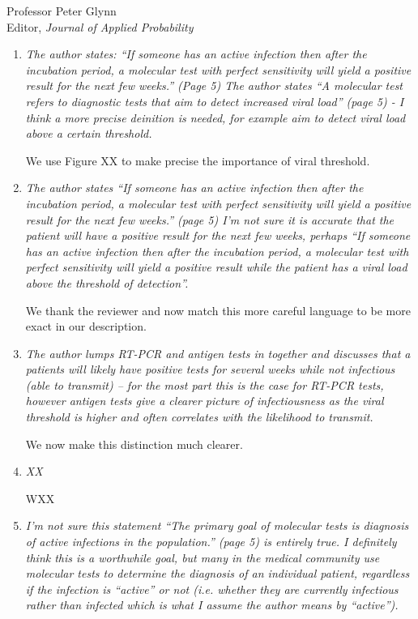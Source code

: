\documentclass[11pt]{letter} %
\begin{document}
\begin{letter}{Professor
	Peter Glynn\\
	Editor, {\em Journal of Applied Probability}}
\begin{enumerate}
We have added remark XX and more carefully put this paper within proper context.
\vspace{5mm}
\item {\it The author states: “If someone has an active infection then after the incubation period, a molecular test with perfect sensitivity will yield a positive result for the next few weeks.” (Page 5) The author states “A molecular test refers to diagnostic tests that aim to detect increased viral load” (page 5) - I think a more precise deinition is needed, for example aim to detect viral load above a certain threshold.}
\vspace{5mm}

We use Figure XX to make precise the importance of viral threshold.
\vspace{5mm}
\item {\it The author states “If someone has an active infection then after the incubation period, a molecular test with perfect sensitivity will yield a positive result for the next few weeks.” (page 5) I’m not sure it is accurate that the patient will have a positive result for the next few weeks, perhaps “If someone has an active infection then after the incubation period, a molecular test with perfect sensitivity will yield a positive result while the patient has a viral load above the threshold of detection”.}
\vspace{5mm}

We thank the reviewer and now match this more careful language to be more exact in our description.
\vspace{5mm}
\item {\it The author lumps RT-PCR and antigen tests in together and discusses that a patients will likely have positive tests for several weeks while not infectious (able to transmit) – for the most part this is the case for RT-PCR tests, however antigen tests give a clearer picture of infectiousness as the viral threshold is higher and often correlates with the likelihood to transmit.}

\vspace{5mm}
We now make this distinction much clearer.
\vspace{5mm}
\item {\it XX}

\vspace{5mm}
WXX
\vspace{5mm}
\item {\it I’m not sure this statement “The primary goal of molecular tests is diagnosis of active infections in the population.” (page 5) is entirely true. I definitely think this is a worthwhile goal, but many in the medical community use molecular tests to determine the diagnosis of an individual patient, regardless if the infection is “active” or not (i.e. whether they are currently infectious rather than infected which is what I assume the author means by “active”).}


\end{enumerate}
\end{letter}
\end{document}
